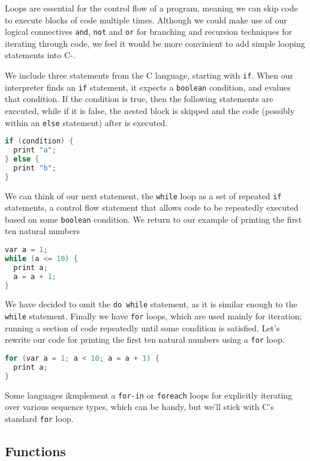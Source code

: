 Loops are essential for the control flow of a program, meaning we can skip code to execute blocks of code multiple times. Although we could make use of our logical connectives \verb+and+, \verb+not+ and \verb+or+ for branching and recursion techniques for iterating through code, we feel it would be more convinient to add simple looping statements into C-. 

We include three statements from the C language, starting with \verb+if+. When our interpreter finds an \verb+if+ statement, it expects a \verb+boolean+ condition, and evalues that condition. If the condition is true, then the following statements are executed, while if it is false, the nested block is skipped and the code (possibly within an \verb+else+ statement) after is executed.

\begin{lstlisting}[language=C]
if (condition) {
  print "a";
} else {
  print "b";
}
\end{lstlisting}

We can think of our next statement, the \verb+while+ loop as a set of repeated \verb+if+ statements, a control flow statement that allows code to be repeatedly executed based on some \verb+boolean+ condition. We return to our example of printing the first ten natural numbers

\begin{lstlisting}[language=C]
var a = 1;
while (a <= 10) {
  print a;
  a = a + 1;
}
\end{lstlisting}

We have decided to omit the \verb+do while+ statement, as it is similar enough to the \verb+while+ statement.
Finally we have \verb+for+ loops, which are used mainly for iteration; running a section of code repeatedly until some condition is satisfied. Let's rewrite our code for printing the first ten natural numbers using a \verb+for+ loop.

\begin{lstlisting}[language=C]
for (var a = 1; a < 10; a = a + 1) {
  print a;
}
\end{lstlisting}

Some languages ikmplement a \verb+for-in+ or \verb+foreach+ loops for explicitly iterating over various sequence types, which can be handy, but we'll stick with C's standard \verb+for+ loop. 

\subsection{Functions}

